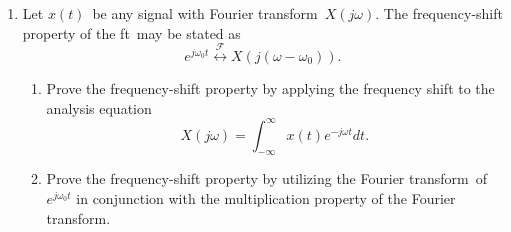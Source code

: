 \documentclass[11pt]{article}
\newcommand\ft{Fourier transform}
\newcommand\xt{$x(t)$}
\newcommand\xo{$X(j\omega)$}
\begin{document}
\begin{enumerate}
    \item Let \xt~be any signal with \ft~\xo. The frequency-shift property of the
    ft~may be stated as
    \begin{equation*}
        e^{j\omega_0 t} \overset{\mathcal{F}}{\longleftrightarrow}  X(j(\omega - \omega_0)).
    \end{equation*}
    \begin{enumerate}
        \item Prove the frequency-shift property by applying the frequency shift to the analysis equation
        \begin{equation*}
            X(j\omega) = \int_{-\infty}^{\infty}x(t)e^{-j\omega t}dt.
        \end{equation*}
        \item Prove the frequency-shift property by utilizing the \ft~of $e^{j\omega_0 t}$ in conjunction with the multiplication property of the \ft.
    \end{enumerate}
\end{enumerate}
\end{document}
